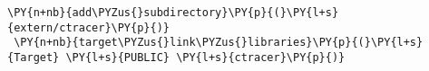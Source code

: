  {\footnotesize
 \begin{Verbatim}[commandchars=\\\{\}]
 \PY{n+nb}{add\PYZus{}subdirectory}\PY{p}{(}\PY{l+s}{extern/ctracer}\PY{p}{)}
 \PY{n+nb}{target\PYZus{}link\PYZus{}libraries}\PY{p}{(}\PY{l+s}{Target} \PY{l+s}{PUBLIC} \PY{l+s}{ctracer}\PY{p}{)}
 \end{Verbatim}
 }
